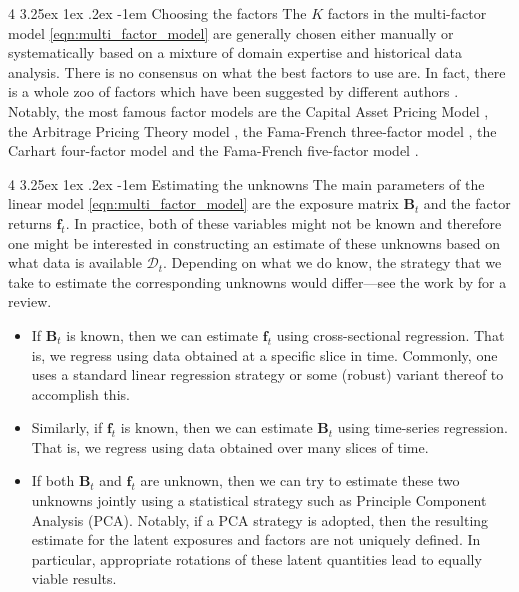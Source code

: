 \documentclass[12pt]{article}
\makeatletter
\renewcommand\paragraph{%
	\@startsection{paragraph}
	{4}
	{\z@}
	{3.25ex \@plus1ex \@minus.2ex}
	{-1em}
	{\normalfont\normalsize\bfseries\maybe@addperiod}%
}
\newcommand{\maybe@addperiod}[1]{%
	#1\@addpunct{.}%
}
\makeatother
\begin{document}
\paragraph{Choosing the factors} The $K$ factors in the multi-factor model \eqref{eqn:multi_factor_model} are generally chosen either manually or systematically based on a mixture of domain expertise and historical data analysis. There is no consensus on what the best factors to use are. In fact, there is a whole zoo of factors which have been suggested by different authors \citep{feng2020jf}. Notably, the most famous factor models are the Capital Asset Pricing Model \citep{sharpe1964jf}, the Arbitrage Pricing Theory model \citep{ross1976joet}, the Fama-French three-factor model \citep{fama1993jofe}, the Carhart four-factor model \citep{carhart1997jf} and the Fama-French five-factor model \citep{fama2015jofe}.

\paragraph{Estimating the unknowns} The main parameters of the linear model \eqref{eqn:multi_factor_model} are the exposure matrix $\mathbf{B}_t$ and the factor returns $\mathbf{f}_t$. In practice, both of these variables might not be known and therefore one might be interested in constructing an estimate of these unknowns based on what data is available $\mathcal{D}_t$. Depending on what we do know, the strategy that we take to estimate the corresponding unknowns would differ---see the work by \cite{giglio2022arfe} for a review. 
\begin{itemize}
	\item If $\mathbf{B}_t$ is known, then we can estimate $\mathbf{f}_t$ using cross-sectional regression. That is, we regress using data obtained at a specific slice in time. Commonly, one uses a standard linear regression strategy or some (robust) variant thereof to accomplish this.
	\item Similarly, if $\mathbf{f}_t$ is known, then we can estimate $\mathbf{B}_t$ using time-series regression. That is, we regress using data obtained over many slices of time.
	\item If both $\mathbf{B}_t$ and $\mathbf{f}_t$ are unknown, then we can try to estimate these two unknowns jointly using a statistical strategy such as Principle Component Analysis (PCA). Notably, if a PCA strategy is adopted, then the resulting estimate for the latent exposures and factors are not uniquely defined. In particular, appropriate rotations of these  latent quantities lead to equally viable results.
\end{itemize}
\end{document}
